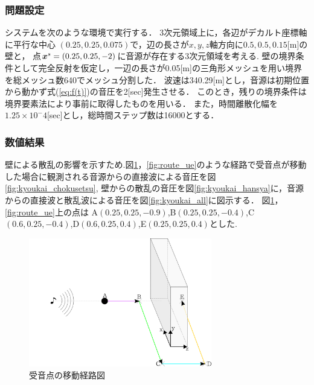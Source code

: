 \documentclass[dvipdfmx]{ampbt}
\def\vector#1{\mbox{\boldmath $#1$}}
\begin{document}
\subsubsection{問題設定}
\label{問題設定}
システムを次のような環境で実行する．
3次元領域上に，各辺がデカルト座標軸に平行な中心 $(0.25,0.25,0.075)$で，辺の長さが$x,y,z$軸方向に$0.5,0.5,0.15$[m]の壁と，
点$\vector{x}^{s}=(0.25,0.25,-2)$に音源が存在する3次元領域を考える.
壁の境界条件として完全反射を仮定し，一辺の長さが0.05[m]の三角形メッシュを用い境界を総メッシュ数640でメッシュ分割した．
波速は340.29[m]とし，音源は初期位置から動かず式(\ref{eq:f(t)})の音圧を2[sec]発生させる．
このとき，残りの境界条件は境界要素法により事前に取得したものを用いる．
また，時間離散化幅を$1.25 \times 10^-4$[sec]とし，総時間ステップ数は16000とする．\par

\subsubsection{数値結果}
壁による散乱の影響を示すため.図\ref{fig:route}，\ref{fig:route_ue}のような経路で受音点が移動した場合に観測される音源からの直接波による音圧を図\ref{fig:kyoukai_chokusetsu},
壁からの散乱の音圧を図\ref{fig:kyoukai_hansya}に，音源からの直接波と散乱波による音圧を図\ref{fig:kyoukai_all}に図示する．
図\ref{fig:route}，\ref{fig:route_ue}上の点は
A$(0.25,0.25,-0.9)$,B$(0.25,0.25,-0.4)$,C$(0.6,0.25,-0.4)$,D$(0.6,0.25,0.4)$,E$(0.25,0.25,0.4)$とした.

\begin{figure}[H]
  \begin{center}
    \includegraphics[clip,width=8.0cm]{./png/route.png}
    \caption{受音点の移動経路図}
    \label{fig:route}
  \end{center}
\end{figure}
\end{document}
